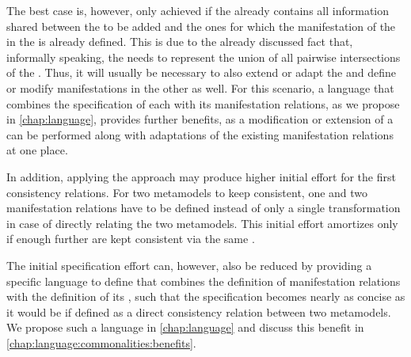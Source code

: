 The best case is, however, only achieved if the \conceptmetamodel already contains all information shared between the \concretemetamodel to be added and the ones for which the manifestation of the \commonalities in the \conceptmetamodel is already defined.
This is due to the already discussed fact that, informally speaking, the \conceptmetamodel needs to represent the union of all pairwise intersections of the \concretemetamodels.
Thus, it will usually be necessary to also extend or adapt the \conceptmetamodel and define or modify manifestations in the other \concretemetamodels as well.
For this scenario, a language that combines the specification of each \commonality with its manifestation relations, as we propose in \autoref{chap:language}, provides further benefits, as a modification or extension of a \commonality can be performed along with adaptations of the existing manifestation relations at one place.

In addition, applying the \commonalities approach may produce higher initial effort for the first consistency relations.
For two metamodels to keep consistent, one \conceptmetamodel and two manifestation relations have to be defined instead of only a single transformation in case of directly relating the two metamodels.
This initial effort amortizes only if enough further \concretemetamodels are kept consistent via the same \conceptmetamodel.

The initial specification effort can, however, also be reduced by providing a specific language to define \commonalities that combines the definition of manifestation relations with the definition of its \commonality, such that the specification becomes nearly as concise as it would be if defined as a direct consistency relation between two metamodels.
We propose such a language in \autoref{chap:language} and discuss this benefit in \autoref{chap:language:commonalities:benefits}.

